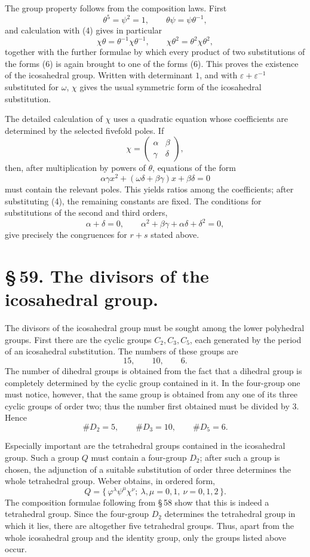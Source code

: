 \documentclass[11pt]{article}
\providecommand{\eps}{\varepsilon}
\providecommand{\eps}{\varepsilon}
\providecommand{\mat}[4]{\begin{pmatrix}#1&#2\\#3&#4\end{pmatrix}}
\providecommand{\mat}[4]{\begin{pmatrix}#1&#2\\#3&#4\end{pmatrix}}
\providecommand{\mat}[1]{\begin{pmatrix}#1\end{pmatrix}}
\begin{document}
The group property follows from the composition laws. First
\begin{equation}
 \theta^5=\psi^2=1,\qquad \theta\psi=\psi\theta^{-1},
\tag{7}
\end{equation}
and calculation with (4) gives in particular
\begin{equation}
 \chi\theta=\theta^{-1}\chi\theta^{-1},\qquad
 \chi\theta^2=\theta^2\chi\theta^2,
\tag{8}
\end{equation}
together with the further formulae by which every product of two substitutions of the forms (6) is again brought to one of the forms (6). This proves the existence of the icosahedral group. Written with determinant $1$, and with $\eps+\eps^{-1}$ substituted for $\omega$, $\chi$ gives the usual symmetric form of the icosahedral substitution.

The detailed calculation of $\chi$ uses a quadratic equation whose coefficients are determined by the selected fivefold poles. If
\[
 \chi=\mat{\alpha}{\beta}{\gamma}{\delta},
\]
then, after multiplication by powers of $\theta$, equations of the form
\[
 \alpha\gamma x^2+(\omega\delta+\beta\gamma)x+\beta\delta=0
\]
must contain the relevant poles. This yields ratios among the coefficients; after substituting (4), the remaining constants are fixed. The conditions for substitutions of the second and third orders,
\[
 \alpha+\delta=0,\qquad
 \alpha^2+\beta\gamma+\alpha\delta+\delta^2=0,
\]
give precisely the congruences for $r+s$ stated above.

\section*{\S\,59. The divisors of the icosahedral group.}

The divisors of the icosahedral group must be sought among the lower polyhedral groups. First there are the cyclic groups $C_2,C_3,C_5$, each generated by the period of an icosahedral substitution. The numbers of these groups are
\[
 15,\qquad 10,\qquad 6.
\]
The number of dihedral groups is obtained from the fact that a dihedral group is completely determined by the cyclic group contained in it. In the four-group one must notice, however, that the same group is obtained from any one of its three cyclic groups of order two; thus the number first obtained must be divided by $3$. Hence
\[
 \#D_2=5,\qquad \#D_3=10,\qquad \#D_5=6.
\]

Especially important are the tetrahedral groups contained in the icosahedral group. Such a group $Q$ must contain a four-group $D_2$; after such a group is chosen, the adjunction of a suitable substitution of order three determines the whole tetrahedral group. Weber obtains, in ordered form,
\begin{equation}
 Q=\{\,\varphi^\lambda\psi^\mu\chi^\nu;\ \lambda,\mu=0,1,\ \nu=0,1,2\,\}.
\tag{1}
\end{equation}
The composition formulae following from \S\,58 show that this is indeed a tetrahedral group. Since the four-group $D_2$ determines the tetrahedral group in which it lies, there are altogether five tetrahedral groups. Thus, apart from the whole icosahedral group and the identity group, only the groups listed above occur.
\end{document}
